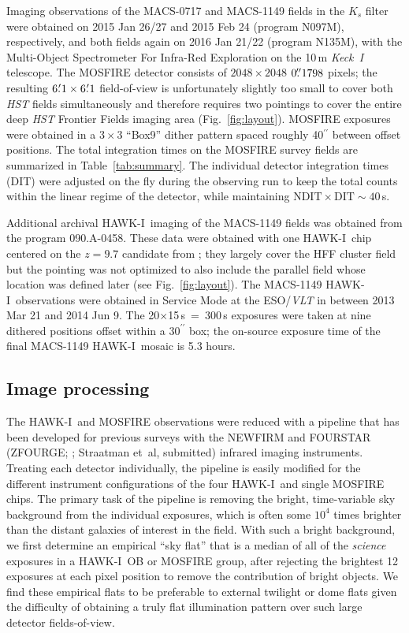\documentclass[preprint2]{aastex6}
\gdef\arcsec{^{\prime\prime}}
\gdef\HAWKI{\mbox{HAWK-I}}
\begin{document}
Imaging observations of the MACS-0717 and MACS-1149 fields in the $K_s$ filter were obtained on 2015 Jan 26/27 and 2015 Feb 24 (program N097M), respectively, and both fields again on 2016 Jan 21/22 (program N135M), with the Multi-Object Spectrometer For Infra-Red Exploration \citep[MOSFIRE;][]{mosfire} on the 10\,m \mbox{\textit{Keck I}} telescope.  The MOSFIRE detector consists of $2048\times2048$ $0\mbox{$.\!\!^{\prime\prime}$}1798$ pixels; the resulting $6\mbox{$.\mkern-4mu^\prime$}1\times6\mbox{$.\mkern-4mu^\prime$}1$ field-of-view is unfortunately slightly too small to cover both \textit{HST} fields simultaneously and therefore requires two pointings to cover the entire deep \textit{HST} Frontier Fields imaging area (Fig.~\ref{fig:layout}).  MOSFIRE exposures were obtained in a $3\times3$ ``Box9'' dither pattern spaced roughly 40$^{\prime\prime}$ between offset positions.  The total integration times on the MOSFIRE survey fields are summarized in Table~\ref{tab:summary}.  The individual detector integration times (DIT) were adjusted on the fly during the observing run to keep the total counts within the linear regime of the detector, while maintaining $\mathrm{NDIT}\times\mathrm{DIT} \sim 40$\,s.


Additional archival \HAWKI\ imaging of the MACS-1149 fields was obtained from the program 090.A-0458.  These data were obtained with one \HAWKI\ chip centered on the $z=9.7$ candidate from \cite{zheng:12}; they largely cover the HFF cluster field but the pointing was not optimized to also include the parallel field whose location was defined later (see Fig.~\ref{fig:layout}).  The MACS-1149 \HAWKI\ observations were obtained in Service Mode at the ESO/\textit{VLT} in between 2013 Mar 21 and 2014 Jun 9.  The 20$\times$15\,s~=~300\,s exposures were taken at nine dithered positions offset within a $30\arcsec$ box; the on-source exposure time of the final MACS-1149 \HAWKI\ mosaic is 5.3 hours.

\subsection{Image processing}
\label{s:processing}


The \HAWKI\ and MOSFIRE observations were reduced with a pipeline that has been developed for previous surveys with the NEWFIRM \citep[NMBS;][]{whitaker:nmbs} and FOURSTAR (ZFOURGE; \citealt{spitler:12}; Straatman et~al, submitted) infrared imaging instruments.  Treating each detector individually, the pipeline is easily modified for the different instrument configurations of the four \HAWKI\ and single MOSFIRE chips.  The primary task of the pipeline is removing the bright, time-variable sky background from the individual exposures, which is often some $10^4$ times brighter than the distant galaxies of interest in the field.  With such a bright background, we first determine an empirical ``sky flat'' that is a median of all of the \textit{science} exposures in a \HAWKI\ OB or MOSFIRE group, after rejecting the brightest 12 exposures at each pixel position to remove the contribution of bright objects.  We find these empirical flats to be preferable to external twilight or dome flats given the difficulty of obtaining a truly flat illumination pattern over such large detector fields-of-view.  
\end{document}
